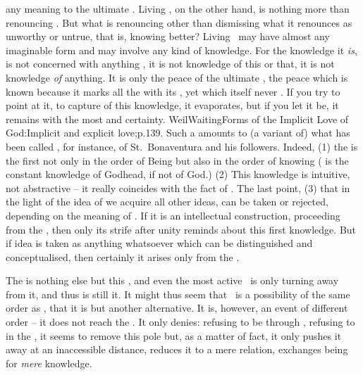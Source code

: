 any meaning to the ultimate . Living \Yes, on the other hand,
is nothing more than renouncing \No. But what is renouncing other than
dismissing what it renounces as unworthy or untrue, that is, knowing better?
Living \Yes\ may have almost any imaginable  form and may involve any
kind of  knowledge. For the knowledge it {\em is}, is not concerned
with anything , it is not knowledge of this or that, it is not
knowledge {\em of} anything. It is only the  peace of the ultimate
, the peace which is known because it marks all the
 with its , yet which itself never
. If you try to point at it, to capture  of this
knowledge, it evaporates, but if you let it be, it remains with the most
 and  certainty. \citet{In what concerns divine
  things, belief is not fitting. Only certainty will do. Anything less than
  certainty is unworthy of God.}{WeilWaiting}{Forms of the Implicit Love of
  God:Implicit and explicit love;p.139. Such a  amounts
  to (a variant of) what has been called , for instance, of
  St.~Bonaventura and his followers. Indeed, (1) the  is the first
  not only in the order of Being but also in the order of knowing (
  is the constant knowledge of Godhead, if not of God.)   (2) This knowledge is intuitive, not abstractive -- it really
  coincides with the fact of . The last point, (3) that in the
  light of the idea of  we acquire all other ideas, can be taken or
  rejected, depending on the meaning of . If it is an intellectual
  construction, proceeding from the , then only its
  strife after unity reminds about this first knowledge. But if idea is taken as
  anything whatsoever which can be distinguished and conceptualised, then
  certainly it arises only from the . }

The  is nothing else but this ,
and even the most active \No\ is only turning away from it, and thus is still
 it.
It might thus seem that \No\ is a possibility of the same order as
\Yes, that it is but another alternative. It is, however, an event of different
order -- it does not reach the . 
 It only denies: refusing to be through , refusing to
   in the , it seems to remove this  pole
  but, as a matter of fact, it only pushes it away at an inaccessible distance,
  reduces it to a mere relation, exchanges being for {\em mere} knowledge.
  
